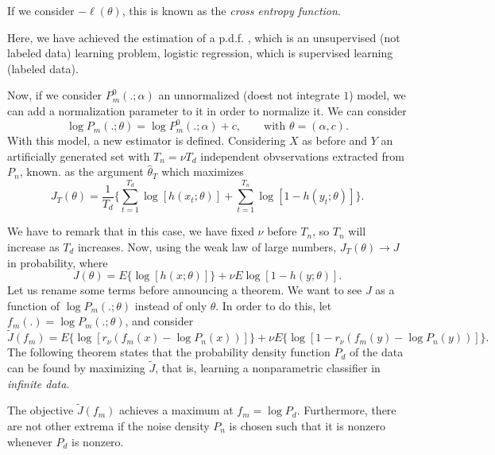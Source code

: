 If we consider $-\ell(\theta)$, this is known as the \emph{cross entropy function}.

\begin{remark}
    Here, we have achieved the estimation of a p.d.f. , which is an unsupervised (not labeled data) learning problem, logistic regression, which is supervised learning (labeled data).
\end{remark}

Now, if we consider $P_m^0(.;\alpha)$ an unnormalized (doest not integrate $1$) model, we can add a normalization parameter to it in order to normalize it. We can consider
\[
\log P_m(.;\theta) = \log P_m^0(.;\alpha ) + c  , \quad \quad \text{with } \theta=(\alpha,c).
\]
With this model, a new estimator is defined. Considering $X$ as before and $Y$ an artificially generated set with $T_n = \nu T_d$ independent obvservations extracted from $P_n$, known. as the argument $\hat{\theta}_T$ which maximizes
\[
J_T(\theta) = \frac{1}{T_d}\{\sum_{t = 1}^{T_d} \log[h(x_t;\theta)] + \sum_{t=1}^{T_n}\log[1-h(y_t;\theta)]\}.
\]

We have to remark that in this case, we have fixed $\nu$ before $T_n$, so $T_n$ will increase as $T_d$ increases. Now, using the weak law of large numbers, $J_T(\theta) \to J$ in probability, where
\[
J(\theta) = E\{\log[h(x;\theta)]\} + \nu E{\log[1-h(y;\theta)]}.
\]
Let us rename some terms before announcing a theorem. We want to see $J$ as a function of $\log P_m(.;\theta)$ instead of only $\theta$. In order to do this, let $f_m(.) = \log P_m(.;\theta)$, and consider
\[
\tilde{J}(f_m) = E\{\log[r_\nu (f_m(x) - \log P_n(x))]\} + \nu E\{\log [1- r_\nu(f_m(y) - \log P_n(y))]\}.    
\]
The following theorem states that the probability density function $P_d$ of the data can be found by maximizing $\tilde{J}$, that is, learning a nonparametric classifier in \emph{infinite data}.

\begin{nth}
The objective $\tilde{J}(f_m)$ achieves a maximum at $f_m = \log P_d$. Furthermore, there are not other extrema if the noise density $P_n$ is chosen such that it is nonzero whenever $P_d$ is nonzero.
\end{nth}